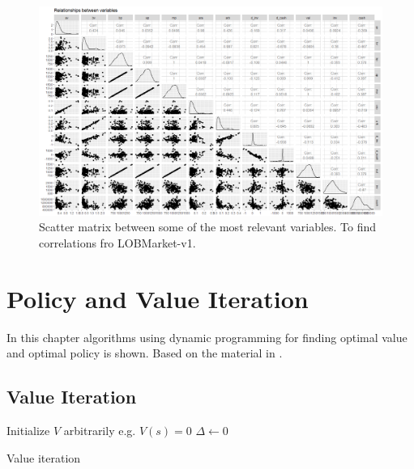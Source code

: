 \documentclass{kththesis}
\theoremstyle{definition}
\begin{document}
 \begin{figure}
\centering
\includegraphics[scale=.6]{scatter_mat_vars.png}
\caption{Scatter matrix between some of the most relevant variables. To find correlations fro LOBMarket-v1. }
\label{fig:cc2}
\end{figure}   




\chapter{Policy and Value Iteration}\label{app:A}
In this chapter algorithms using dynamic programming for finding optimal value and optimal policy is shown. Based on the material in \parencite{sutton1998reinforcement}.

\section{Value Iteration}
\LinesNumbered
\begin{algorithm}[H]
 \textsf{Initialize $V$ arbitrarily e.g. $V(s) = 0$} \;
 $\Delta \leftarrow 0$ \;
 \caption{Value iteration}
 \label{alg2}
\end{algorithm}
\end{document}
